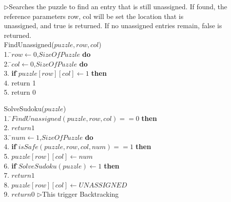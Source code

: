 \documentclass[12pt, letterpaper]{article}
\begin{document}
            \begin{center}
            \begin{tabbing}
            $\rhd$Searches the puzzle to find an entry that is still unassigned. If
               found, the\\ reference parameters row, col will be set the location
               that is\\ unassigned, and true is returned. If no unassigned entries
               remain, false is returned.\\
            FindUnassigned($puzzle, row, col $) \\
            1.  \=$row \leftarrow 0$,$SizeOfPuzzle$ {\bf do} \\
            2. \indent            {} \=$col \leftarrow 0$,$SizeOfPuzzle$ {\bf do} \\
            3. \indent 	      \> 	\>  {\bf if} \=$puzzle[row][col] \leftarrow 1$ {\bf then} \\
            4. \indent            \>		 \>	\> return 1\\
            5. \indent return 0 \\
            \end{tabbing}
            \label{fig_alg_ex}
            \end{center}

            \begin{center}
            \begin{tabbing}
            SolveSudoku($puzzle$) \\
            1.  \=$FindUnassigned(puzzle, row, col ) == 0 $ {\bf then} \\
            2. \indent            \> $return 1$ \\
            3.  \=$num \leftarrow 1$,$SizeOfPuzzle$ {\bf do} \\
            4. \indent            \> {\bf if} \=$isSafe(puzzle, row,col,num) == 1$ {\bf then} \\
            5. \indent            \>		 \>$puzzle[row][col] \leftarrow num $ \\
            6. \indent            \>            \> {\bf if} \=$SolveSudoku(puzzle) \leftarrow 1$ {\bf then} \\
            7. \indent            \>            \> 	\>$return 1$ \\
            8. \indent            \> 	 \>$puzzle[row][col] \leftarrow UNASSIGNED$ \\
            9. \indent $return  0$      \>\>\> $\rhd$This trigger Backtracking 
            \end{tabbing}
            \label{fig_alg_ex}
            \end{center}
            
\end{document}
